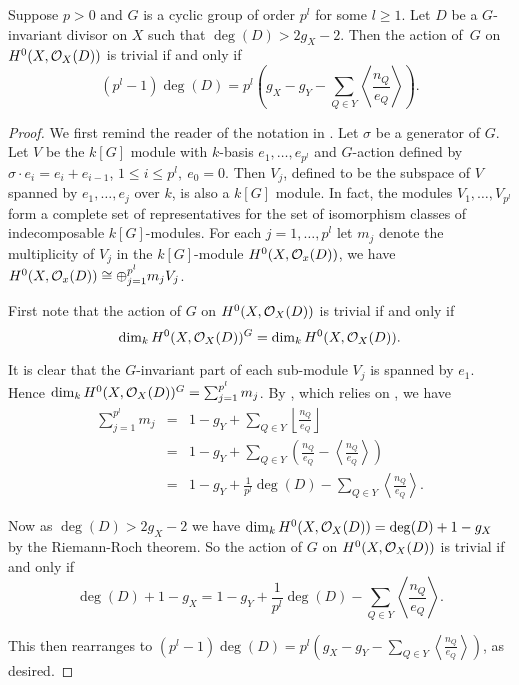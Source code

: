   \begin{prop}\label{nakaj}
    Suppose $p>0$ and $G$ is a cyclic group of order $p^l$ for some $l\geq 1$.
    Let $D$ be a $G$-invariant divisor on $X$ such that $\deg(D)>2g_X-2$.
    Then the action of~$G$ on $H^0(X,{\cal O}_X(D))$ is trivial if and only if
      \[ 
	(p^l-1)\deg(D)=p^l\left(g_X-g_Y-\sum_{Q\in Y}\left\langle \frac{n_Q}{e_Q} \right\rangle\right).
      \]
  \end{prop}
  \begin{proof}
We first remind the reader of the notation in \cite{kako}.
Let $\sigma$ be a generator of $G$.
Let $V$ be the $k[G]$ module with $k$-basis $e_1,\ldots ,e_{p^l}$ and $G$-action defined by $\sigma\cdot e_i=e_i+e_{i-1}$, $1\leq i \leq p^l,\ e_0=0$.
Then $V_j$, defined to be the subspace of $V$ spanned by $e_1,\ldots ,e_j$ over $k$, is also a $k[G]$ module.
In fact, the modules $V_1,\ldots ,V_{p^l}$ form a complete set of representatives for the set of isomorphism classes of indecomposable $k[G]$-modules. For each $j=1,\ldots,p^l$ let $m_j$ denote the multiplicity of $V_j$ in the $k[G]$-module $H^0(X,{\cal O}_x(D))$, \ie we have $H^0(X,{\cal O}_x(D))\cong \oplus_{j=1}^{p^l}m_jV_j$.



    First note that the action of $G$ on $H^0(X,{\cal O}_X(D))$ is trivial if and only if
      \begin{equation}\label{triva}
	\dim_k H^0(X,{\cal O}_X(D))^G =\dim_k H^0(X,{\cal O}_X(D)).
      \end{equation}
	
    It is clear that the $G$-invariant part of each sub-module $V_j$ is spanned by $e_1$. 
    Hence $\dim_kH^0(X,{\cal O}_X(D))^G = \sum_{j=1}^{p^l} m_j$.
    By \cite[Thm 2.1]{quaddiffequi}, which relies on \cite{cohogsheaves}, we have
      \begin{eqnarray*}
	\sum_{j=1}^{p^l} m_j & = & 1- g_Y +\sum_{Q\in Y} \left\lfloor \frac{n_Q}{e_Q}\right\rfloor\\
	& = & 1- g_Y + \sum_{Q\in Y} \left( \frac{n_Q}{e_Q} - \left\langle \frac{n_Q}{e_Q}\right\rangle \right) \\
  	& = & 1 - g_Y + \frac{1}{p^l}\deg(D) - \sum_{Q\in Y} \left\langle \frac{n_Q}{e_Q} \right\rangle.
      \end{eqnarray*}

    Now as $\deg(D)>2g_X-2$ we have $\dim_kH^0(X,{\cal O}_X(D)) =\deg(D)+1-g_X$ by the Riemann-Roch theorem. 
    So the action of $G$ on $H^0(X,{\cal O}_X(D))$ is trivial if and only if
      \begin{equation*}
	\deg(D)+1-g_X  = 1 - g_Y + \frac{1}{p^l}\deg(D) - \sum_{Q\in Y}\left\langle \frac{n_Q}{e_Q} \right\rangle. \label{hi}
      \end{equation*}

    This then rearranges to $(p^l-1)\deg(D)=p^l\left(g_X-g_Y-\sum_{Q\in Y}\left\langle \frac{n_Q}{e_Q} \right\rangle\right)$, as desired.
    \end{proof}

